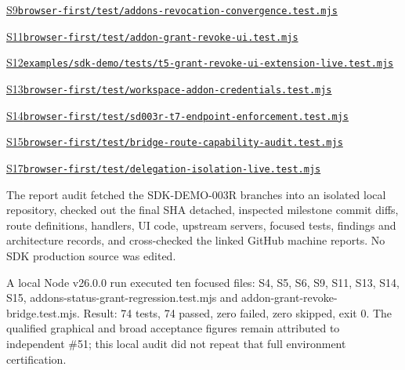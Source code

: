\documentclass[11pt,letterpaper]{article}
\begin{document}
{\footnotesize\href{https://github.com/vonstegen/2.0.0-alpha/blob/180f3067906d4782df5b923ca46ef77b80828333/browser-first/test/addons-revocation-convergence.test.mjs}{S9\quad \nolinkurl{browser-first/test/addons-revocation-convergence.test.mjs}}\par}
{\footnotesize\href{https://github.com/vonstegen/2.0.0-alpha/blob/180f3067906d4782df5b923ca46ef77b80828333/browser-first/test/addon-grant-revoke-ui.test.mjs}{S11\quad \nolinkurl{browser-first/test/addon-grant-revoke-ui.test.mjs}}\par}
{\footnotesize\href{https://github.com/vonstegen/2.0.0-alpha/blob/180f3067906d4782df5b923ca46ef77b80828333/examples/sdk-demo/tests/t5-grant-revoke-ui-extension-live.test.mjs}{S12\quad \nolinkurl{examples/sdk-demo/tests/t5-grant-revoke-ui-extension-live.test.mjs}}\par}
{\footnotesize\href{https://github.com/vonstegen/2.0.0-alpha/blob/180f3067906d4782df5b923ca46ef77b80828333/browser-first/test/workspace-addon-credentials.test.mjs}{S13\quad \nolinkurl{browser-first/test/workspace-addon-credentials.test.mjs}}\par}
{\footnotesize\href{https://github.com/vonstegen/2.0.0-alpha/blob/180f3067906d4782df5b923ca46ef77b80828333/browser-first/test/sd003r-t7-endpoint-enforcement.test.mjs}{S14\quad \nolinkurl{browser-first/test/sd003r-t7-endpoint-enforcement.test.mjs}}\par}
{\footnotesize\href{https://github.com/vonstegen/2.0.0-alpha/blob/180f3067906d4782df5b923ca46ef77b80828333/browser-first/test/bridge-route-capability-audit.test.mjs}{S15\quad \nolinkurl{browser-first/test/bridge-route-capability-audit.test.mjs}}\par}
{\footnotesize\href{https://github.com/vonstegen/2.0.0-alpha/blob/180f3067906d4782df5b923ca46ef77b80828333/browser-first/test/delegation-isolation-live.test.mjs}{S17\quad \nolinkurl{browser-first/test/delegation-isolation-live.test.mjs}}\par}
\vspace{3pt}{\normalsize\bfseries A1  Mechanical inspection and corroboration}\par
The report audit fetched the SDK-DEMO-003R branches into an isolated local repository, checked out the final SHA detached, inspected milestone commit diffs, route definitions, handlers, UI code, upstream servers, focused tests, findings and architecture records, and cross-checked the linked GitHub machine reports. No SDK production source was edited.\par
A local Node v26.0.0 run executed ten focused files: S4, S5, S6, S9, S11, S13, S14, S15, addons-status-grant-regression.test.mjs and addon-grant-revoke-bridge.test.mjs. Result: 74 tests, 74 passed, zero failed, zero skipped, exit 0. The qualified graphical and broad acceptance figures remain attributed to independent \#51; this local audit did not repeat that full environment certification.\par
\end{document}

